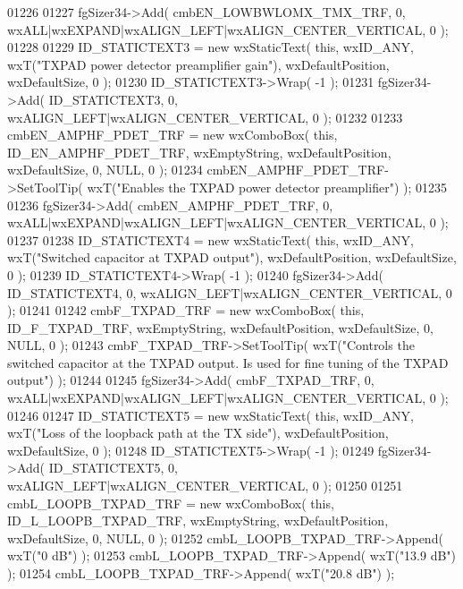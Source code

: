 \begin{DoxyCode}
01226     
01227     fgSizer34->Add( cmbEN_LOWBWLOMX_TMX_TRF, 0, wxALL|wxEXPAND|wxALIGN\_LEFT|wxALIGN\_CENTER\_VERTICAL, 0 );
01228     
01229     ID_STATICTEXT3 = \textcolor{keyword}{new} wxStaticText( \textcolor{keyword}{this}, wxID\_ANY, wxT(\textcolor{stringliteral}{"TXPAD power detector preamplifier gain"}), 
      wxDefaultPosition, wxDefaultSize, 0 );
01230     ID_STATICTEXT3->Wrap( -1 );
01231     fgSizer34->Add( ID_STATICTEXT3, 0, wxALIGN\_LEFT|wxALIGN\_CENTER\_VERTICAL, 0 );
01232     
01233     cmbEN_AMPHF_PDET_TRF = \textcolor{keyword}{new} wxComboBox( \textcolor{keyword}{this}, ID_EN_AMPHF_PDET_TRF, wxEmptyString, wxDefaultPosition, 
      wxDefaultSize, 0, NULL, 0 ); 
01234     cmbEN_AMPHF_PDET_TRF->SetToolTip( wxT(\textcolor{stringliteral}{"Enables the TXPAD power detector preamplifier"}) );
01235     
01236     fgSizer34->Add( cmbEN_AMPHF_PDET_TRF, 0, wxALL|wxEXPAND|wxALIGN\_LEFT|wxALIGN\_CENTER\_VERTICAL, 0 );
01237     
01238     ID_STATICTEXT4 = \textcolor{keyword}{new} wxStaticText( \textcolor{keyword}{this}, wxID\_ANY, wxT(\textcolor{stringliteral}{"Switched capacitor at TXPAD output"}), 
      wxDefaultPosition, wxDefaultSize, 0 );
01239     ID_STATICTEXT4->Wrap( -1 );
01240     fgSizer34->Add( ID_STATICTEXT4, 0, wxALIGN\_LEFT|wxALIGN\_CENTER\_VERTICAL, 0 );
01241     
01242     cmbF_TXPAD_TRF = \textcolor{keyword}{new} wxComboBox( \textcolor{keyword}{this}, ID_F_TXPAD_TRF, wxEmptyString, wxDefaultPosition, wxDefaultSize,
       0, NULL, 0 ); 
01243     cmbF_TXPAD_TRF->SetToolTip( wxT(\textcolor{stringliteral}{"Controls the switched capacitor at the TXPAD output. Is used for fine
       tuning of the TXPAD output"}) );
01244     
01245     fgSizer34->Add( cmbF_TXPAD_TRF, 0, wxALL|wxEXPAND|wxALIGN\_LEFT|wxALIGN\_CENTER\_VERTICAL, 0 );
01246     
01247     ID_STATICTEXT5 = \textcolor{keyword}{new} wxStaticText( \textcolor{keyword}{this}, wxID\_ANY, wxT(\textcolor{stringliteral}{"Loss of the loopback path at the TX side"}), 
      wxDefaultPosition, wxDefaultSize, 0 );
01248     ID_STATICTEXT5->Wrap( -1 );
01249     fgSizer34->Add( ID_STATICTEXT5, 0, wxALIGN\_LEFT|wxALIGN\_CENTER\_VERTICAL, 0 );
01250     
01251     cmbL_LOOPB_TXPAD_TRF = \textcolor{keyword}{new} wxComboBox( \textcolor{keyword}{this}, ID_L_LOOPB_TXPAD_TRF, wxEmptyString, wxDefaultPosition, 
      wxDefaultSize, 0, NULL, 0 );
01252     cmbL_LOOPB_TXPAD_TRF->Append( wxT(\textcolor{stringliteral}{"0 dB"}) );
01253     cmbL_LOOPB_TXPAD_TRF->Append( wxT(\textcolor{stringliteral}{"13.9 dB"}) );
01254     cmbL_LOOPB_TXPAD_TRF->Append( wxT(\textcolor{stringliteral}{"20.8 dB"}) );

\end{DoxyCode}
